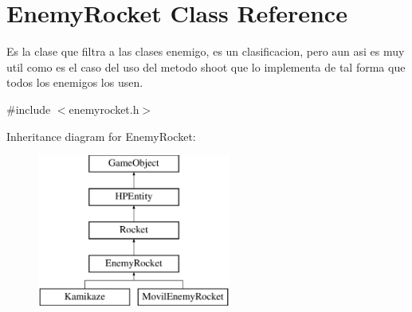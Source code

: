 \hypertarget{class_enemy_rocket}{\section{Enemy\-Rocket Class Reference}
\label{class_enemy_rocket}
}


Es la clase que filtra a las clases enemigo, es un clasificacion, pero aun asi es muy util como es el caso del uso del metodo shoot que lo implementa de tal forma que todos los enemigos los usen.  




{\ttfamily \#include $<$enemyrocket.\-h$>$}

Inheritance diagram for Enemy\-Rocket\-:\begin{figure}[H]
\begin{center}
\leavevmode
\includegraphics[height=5.000000cm]{class_enemy_rocket}
\end{center}
\end{figure}
